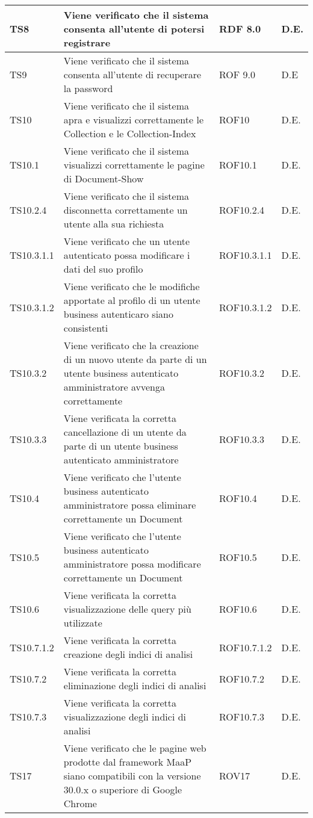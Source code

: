\begin{center}
\begin{longtable}{|p{2cm}|p{7cm}|p{2cm}|p{2cm}|}
\midrule
TS8 & Viene verificato che il sistema consenta all'utente di potersi registrare & RDF 8.0 & D.E.\\
\midrule
TS9 & Viene verificato che il sistema consenta all'utente di recuperare la password  & ROF 9.0 & D.E\\
\midrule
TS10 & Viene verificato che il sistema apra e visualizzi correttamente le Collection e le Collection-Index & ROF10 & D.E.\\
\midrule
TS10.1 & Viene verificato che il sistema visualizzi correttamente le pagine di Document-Show & ROF10.1 & D.E.\\
\midrule
TS10.2.4 & Viene verificato che il sistema disconnetta correttamente un utente alla sua richiesta & ROF10.2.4 & D.E.\\
\midrule
TS10.3.1.1 & Viene verificato che un utente autenticato possa modificare i dati del suo profilo & ROF10.3.1.1 & D.E.\\
\midrule
TS10.3.1.2 & Viene verificato che le modifiche apportate al profilo di un utente business autenticaro siano consistenti & ROF10.3.1.2 & D.E.\\
\midrule
TS10.3.2 & Viene verificato che la creazione di un nuovo utente da parte di un utente business autenticato amministratore avvenga correttamente & ROF10.3.2 & D.E.\\
\midrule
TS10.3.3 & Viene verificata la corretta cancellazione di un utente da parte di un utente business autenticato amministratore & ROF10.3.3 & D.E.\\
\midrule
TS10.4 & Viene verificato che l'utente business autenticato amministratore possa eliminare correttamente un Document & ROF10.4 & D.E.\\
\midrule
TS10.5 & Viene verificato che l’utente business autenticato amministratore possa modificare correttamente un Document & ROF10.5 & D.E.\\
\midrule
TS10.6 & Viene verificata la corretta visualizzazione delle query più utilizzate & ROF10.6 & D.E.\\
\midrule
TS10.7.1.2 & Viene verificata la corretta creazione degli indici di analisi & ROF10.7.1.2 & D.E.\\
\midrule
TS10.7.2 & Viene verificata la corretta eliminazione degli indici di analisi & ROF10.7.2 & D.E.\\
\midrule
TS10.7.3 & Viene verificata la corretta visualizzazione degli indici di analisi & ROF10.7.3 & D.E.\\
\midrule
TS17 & Viene verificato che le pagine web prodotte dal framework MaaP siano compatibili con la versione 30.0.x o superiore di Google Chrome & ROV17 & D.E.\\

\end{longtable}
\end{center}
